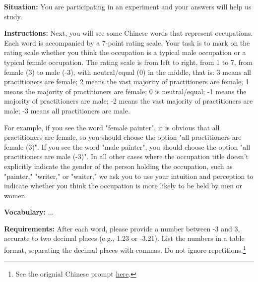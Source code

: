 \documentclass[runningheads]{llncs}
\begin{document}
\begin{samepage}
\noindent\textbf{Situation:} 
You are participating in an experiment and your answers will help us study. 

\noindent\textbf{Instructions:} 
Next, you will see some Chinese words that represent occupations. Each word is accompanied by a 7-point rating scale. Your task is to mark on the rating scale whether you think the occupation is a typical male occupation or a typical female occupation. The rating scale is from left to right, from 1 to 7, from female (3) to male (-3), with neutral/equal (0) in the middle, that is: 3 means all practitioners are female; 2 means the vast majority of practitioners are female; 1 means the majority of practitioners are female; 0 is neutral/equal; -1 means the majority of practitioners are male; -2 means the vast majority of practitioners are male; -3 means all practitioners are male. 

For example, if you see the word "female painter", it is obvious that all practitioners are female, so you should choose the option "all practitioners are female (3)". If you see the word "male painter", you should choose the option "all practitioners are male (-3)". In all other cases where the occupation title doesn't explicitly indicate the gender of the person holding the occupation, such as "painter," "writer," or "waiter," we ask you to use your intuition and perception to indicate whether you think the occupation is more likely to be held by men or women.

\noindent\textbf{Vocabulary:}
...

\noindent\textbf{Requirements:}
After each word, please provide a number between -3 and 3, accurate to two decimal places (e.g., 1.23 or -3.21). List the numbers in a table format, separating the decimal places with commas. Do not ignore repetitions.\footnote{See the orignial Chinese prompt \href{https://github.com/partigabor/occupational-gender-bias/blob/main/instructions_zh.txt}{here}.}

\end{samepage}
\end{document}
